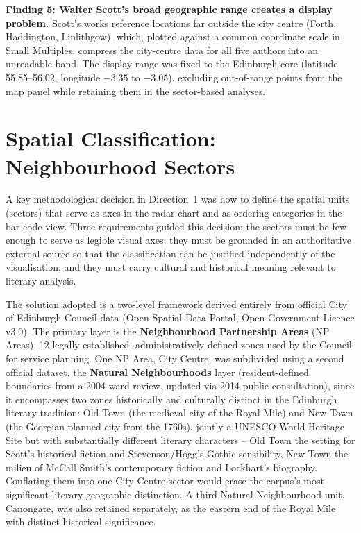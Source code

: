 \documentclass[logo,msc]{infthesis}
\begin{document}
\textbf{Finding 5: Walter Scott's broad geographic range creates a display problem.} Scott's works reference locations far outside the city centre (Forth, Haddington, Linlithgow), which, plotted against a common coordinate scale in Small Multiples, compress the city-centre data for all five authors into an unreadable band. The display range was fixed to the Edinburgh core (latitude 55.85--56.02, longitude $-3.35$ to $-3.05$), excluding out-of-range points from the map panel while retaining them in the sector-based analyses.
 
\section{Spatial Classification: Neighbourhood Sectors}
\label{sec:sectors}
 
A key methodological decision in Direction~1 was how to define the spatial units (sectors) that serve as axes in the radar chart and as ordering categories in the bar-code view. Three requirements guided this decision: the sectors must be few enough to serve as legible visual axes; they must be grounded in an authoritative external source so that the classification can be justified independently of the visualisation; and they must carry cultural and historical meaning relevant to literary analysis.
 
The solution adopted is a two-level framework derived entirely from official City of Edinburgh Council data (Open Spatial Data Portal, Open Government Licence v3.0). The primary layer is the \textbf{Neighbourhood Partnership Areas} (NP Areas), 12 legally established, administratively defined zones used by the Council for service planning. One NP Area, City Centre, was subdivided using a second official dataset, the \textbf{Natural Neighbourhoods} layer (resident-defined boundaries from a 2004 ward review, updated via 2014 public consultation), since it encompasses two zones historically and culturally distinct in the Edinburgh literary tradition: Old Town (the medieval city of the Royal Mile) and New Town (the Georgian planned city from the 1760s), jointly a UNESCO World Heritage Site but with substantially different literary characters -- Old Town the setting for Scott's historical fiction and Stevenson/Hogg's Gothic sensibility, New Town the milieu of McCall Smith's contemporary fiction and Lockhart's biography. Conflating them into one City Centre sector would erase the corpus's most significant literary-geographic distinction. A third Natural Neighbourhood unit, Canongate, was also retained separately, as the eastern end of the Royal Mile with distinct historical significance.
 
\end{document}
